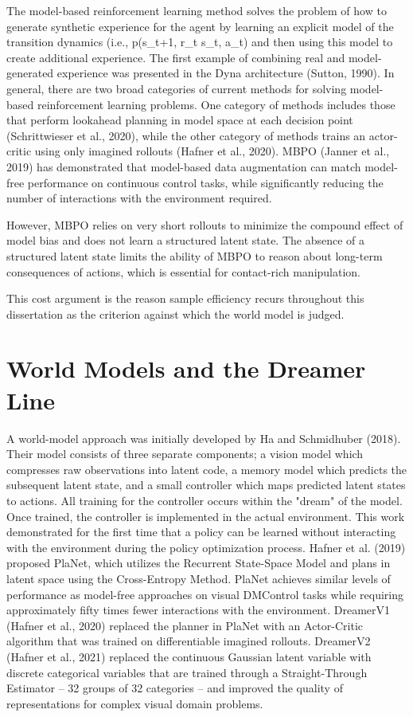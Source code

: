 \documentclass[12pt,a4paper,oneside]{report}
\begin{document}
The model-based reinforcement learning method solves the problem of how to generate synthetic experience for the agent by learning an explicit model of the transition dynamics (i.e., p(s\_t+1, r\_t \textbar{} s\_t, a\_t) and then using this model to create additional experience. The first example of combining real and model-generated experience was presented in the Dyna architecture (Sutton, 1990). In general, there are two broad categories of current methods for solving model-based reinforcement learning problems. One category of methods includes those that perform lookahead planning in model space at each decision point (Schrittwieser et al., 2020), while the other category of methods trains an actor-critic using only imagined rollouts (Hafner et al., 2020). MBPO (Janner et al., 2019) has demonstrated that model-based data augmentation can match model-free performance on continuous control tasks, while significantly reducing the number of interactions with the environment required.

However, MBPO relies on very short rollouts to minimize the compound effect of model bias and does not learn a structured latent state. The absence of a structured latent state limits the ability of MBPO to reason about long-term consequences of actions, which is essential for contact-rich manipulation.

This cost argument is the reason sample efficiency recurs throughout this
dissertation as the criterion against which the world model is judged.

\hypertarget{world-models-and-the-dreamer-line}{%
\section{World Models and the Dreamer Line}\label{world-models-and-the-dreamer-line}}

A world-model approach was initially developed by Ha and Schmidhuber (2018). Their model consists of three separate components; a vision model which compresses raw observations into latent code, a memory model which predicts the subsequent latent state, and a small controller which maps predicted latent states to actions. All training for the controller occurs within the "dream" of the model. Once trained, the controller is implemented in the actual environment. This work demonstrated for the first time that a policy can be learned without interacting with the environment during the policy optimization process. Hafner et al. (2019) proposed PlaNet, which utilizes the Recurrent State-Space Model and plans in latent space using the Cross-Entropy Method. PlaNet achieves similar levels of performance as model-free approaches on visual DMControl tasks while requiring approximately fifty times fewer interactions with the environment. DreamerV1 (Hafner et al., 2020) replaced the planner in PlaNet with an Actor-Critic algorithm that was trained on differentiable imagined rollouts. DreamerV2 (Hafner et al., 2021) replaced the continuous Gaussian latent variable with discrete categorical variables that are trained through a Straight-Through Estimator -- 32 groups of 32 categories -- and improved the quality of representations for complex visual domain problems.
\end{document}
